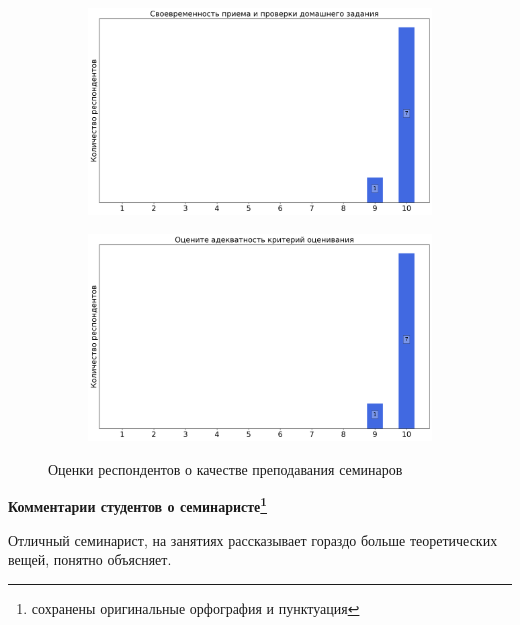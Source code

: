\begin{figure}[H]
\begin{subfigure}[b]{0.45\textwidth}
			\end{subfigure}
			\begin{subfigure}[b]{0.45\textwidth}
				\centering
				\includegraphics[width=\textwidth]{images/4 course/Введение в распараллеливание алгоритмов и программ/seminarists-marks-Лапушкин А.Г.-2.png}
			\end{subfigure}
			\begin{subfigure}[b]{0.45\textwidth}
				\centering
				\includegraphics[width=\textwidth]{images/4 course/Введение в распараллеливание алгоритмов и программ/seminarists-marks-Лапушкин А.Г.-3.png}
			\end{subfigure}	
			\caption{Оценки респондентов о качестве преподавания семинаров}
		\end{figure}

		\textbf{Комментарии студентов о семинаристе\protect\footnote{сохранены оригинальные орфография и пунктуация}}
            \begin{commentbox} 
                Отличный семинарист, на занятиях рассказывает гораздо больше теоретических вещей, понятно объясняет. 
            \end{commentbox} 
        
